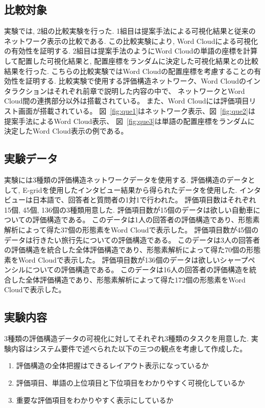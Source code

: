 \documentclass[syuuron]{kuee}
\begin{document}
		\subsection{比較対象}
			実験では, 2組の比較実験を行った. 
			1組目は提案手法による可視化結果と従来のネットワーク表示の比較である. 
			この比較実験により, Word Cloudによる可視化の有効性を証明する. 
			2組目は提案手法のようにWord Cloudの単語の座標を計算して配置した可視化結果と, 配置座標をランダムに決定した可視化結果との比較結果を行った. 
			こちらの比較実験ではWord Cloudの配置座標を考慮することの有効性を証明する. 
			比較実験で使用する評価構造ネットワーク、Word Cloudのインタラクションはそれぞれ前章で説明した内容の中で、
			ネットワークとWord Cloud間の連携部分以外は搭載されている。
			また、Word Cloudには評価項目リスト画面が搭載されている。
			図~\ref{fig:que1}はネットワーク表示、図~\ref{fig:que2}は提案手法によるWord Cloud表示、
			図~\ref{fig:que3}は単語の配置座標をランダムに決定したWord Cloud表示の例である。
			
		\subsection{実験データ}
			実験には3種類の評価構造ネットワークデータを使用する. 
			評価構造のデータとして, E-gridを使用したインタビュー結果から得られたデータを使用した.
			インタビューは日本語で、回答者と質問者の1対1で行われた。
			評価項目数はそれぞれ15個, 45個, 136個の3種類用意した. 
			評価項目数が15個のデータは欲しい自動車についての評価構造である。
			このデータは1人の回答者の評価構造であり、形態素解析によって得た37個の形態素をWord Cloudで表示した。
			評価項目数が45個のデータは行きたい旅行先についての評価構造である。
			このデータは3人の回答者の評価構造を統合した全体評価構造であり、形態素解析によって得た70個の形態素をWord Cloudで表示した。
			評価項目数が136個のデータは欲しいシャープペンシルについての評価構造である。
			このデータは16人の回答者の評価構造を統合した全体評価構造であり、形態素解析によって得た172個の形態素をWord Cloudで表示した。
		
		\subsection{実験内容}
			3種類の評価構造データの可視化に対してそれぞれ3種類のタスクを用意した. 
			実験内容はシステム要件で述べられた以下の三つの観点を考慮して作成した。
			\begin{enumerate}
				\item 評価構造の全体把握はできるレイアウト表示になっているか
				\item 評価項目、単語の上位項目と下位項目をわかりやすく可視化しているか
				\item 重要な評価項目をわかりやすく表示にしているか
			\end{enumerate}
\end{document}
